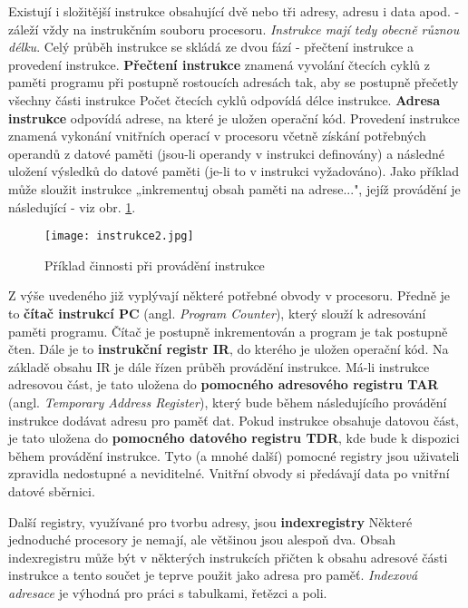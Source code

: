     Existují i složitější instrukce obsahující dvě nebo tři adresy, adresu i data apod. - záleží 
    vždy na instrukčním souboru procesoru. \emph{Instrukce mají tedy obecně různou délku}. Celý 
    průběh instrukce se skládá ze dvou fází - přečtení instrukce a provedení instrukce. 
    \textbf{Přečtení instrukce} znamená vyvolání čtecích cyklů z paměti programu při postupně 
    rostoucích adresách tak, aby se postupně přečetly všechny části instrukce Počet čtecích cyklů 
    odpovídá délce instrukce. \textbf{Adresa instrukce} odpovídá adrese, na které je uložen 
    operační kód. Provedení instrukce znamená vykonání vnitřních operací v procesoru včetně získání 
    potřebných operandů z datové paměti (jsou-li operandy v instrukci definovány) a následné 
    uložení výsledků do datové paměti (je-li to v instrukci vyžadováno). Jako příklad může sloužit 
    instrukce „inkrementuj obsah paměti na adrese...", jejíž provádění je následující - viz obr. 
    \ref{MIT:fig_intrukce}.

    \begin{figure}[ht!] %
      \centering
      \texttt{[image: instrukce2.jpg]}
      \caption{Příklad činnosti při provádění instrukce}
      \label{MIT:fig_intrukce}
    \end{figure}
    
    Z výše uvedeného již vyplývají některé potřebné obvody v procesoru. Předně je to \textbf{čítač 
    instrukcí PC} (angl. \emph{Program Counter}), který slouží k adresování paměti programu. Čítač 
    je postupně inkrementován a program je tak postupně čten. Dále je to \textbf{instrukční registr 
    IR}, do kterého je uložen operační kód. Na základě obsahu IR je dále řízen průběh provádění 
    instrukce. Má-li instrukce adresovou část, je tato uložena do \textbf{pomocného adresového 
    registru TAR} (angl. \emph{Temporary Address Register}), který bude během následujícího 
    provádění instrukce dodávat adresu pro paměť dat. Pokud instrukce obsahuje datovou část, je 
    tato uložena do \textbf{pomocného datového registru TDR}, kde bude k dispozici během provádění 
    instrukce. Tyto (a mnohé další) pomocné registry jsou uživateli zpravidla nedostupné a 
    neviditelné. Vnitřní obvody si předávají data po vnitřní datové sběrnici.
    
    Další registry, využívané pro tvorbu adresy, jsou \textbf{indexregistry} Některé jednoduché 
    procesory je nemají, ale většinou jsou alespoň dva. Obsah indexregistru může být v některých 
    instrukcích přičten k obsahu adresové části instrukce a tento součet je teprve použit jako 
    adresa pro paměť. \emph{Indexová adresace} je výhodná pro práci s tabulkami, řetězci a poli.
    
